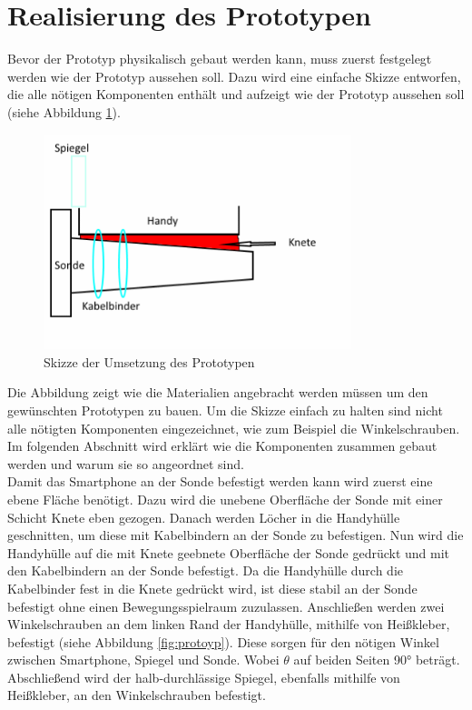 \section{Realisierung des Prototypen}

Bevor der Prototyp physikalisch gebaut werden kann, muss zuerst festgelegt werden wie der Prototyp aussehen soll. Dazu wird eine einfache Skizze entworfen, die alle nötigen Komponenten enthält und aufzeigt wie der Prototyp aussehen soll (siehe Abbildung \ref{fig:protoyp_skizze_umsetzung}).
\begin{figure}[h]
	\centering
	\includegraphics[width=0.80\textwidth]{Prototypen_Bau/Prototyp_skizze}
	\caption{Skizze der Umsetzung des Prototypen}
	\label{fig:protoyp_skizze_umsetzung}
\end{figure}
Die Abbildung zeigt wie die Materialien angebracht werden müssen um den gewünschten Prototypen zu bauen. Um die Skizze einfach zu halten sind nicht alle nötigten Komponenten eingezeichnet, wie zum Beispiel die Winkelschrauben. Im folgenden Abschnitt wird erklärt wie die Komponenten zusammen gebaut werden und warum sie so angeordnet sind.\\
Damit das Smartphone an der Sonde befestigt werden kann wird zuerst eine ebene Fläche benötigt. Dazu wird die unebene Oberfläche der Sonde mit einer Schicht Knete eben gezogen. Danach werden Löcher in die Handyhülle geschnitten, um diese mit Kabelbindern an der Sonde zu befestigen. Nun wird die Handyhülle auf die mit Knete geebnete Oberfläche der Sonde gedrückt und mit den Kabelbindern an der Sonde befestigt. Da die Handyhülle durch die Kabelbinder fest in die Knete gedrückt wird, ist diese stabil an der Sonde befestigt ohne einen Bewegungsspielraum zuzulassen. Anschließen werden zwei Winkelschrauben an dem linken Rand der Handyhülle, mithilfe von Heißkleber, befestigt (siehe Abbildung \ref{fig:protoyp}). Diese sorgen für den nötigen Winkel zwischen Smartphone, Spiegel und Sonde. Wobei $\theta$ auf beiden Seiten 90° beträgt. Abschließend wird der halb-durchlässige Spiegel, ebenfalls mithilfe von Heißkleber, an den Winkelschrauben befestigt.\\
